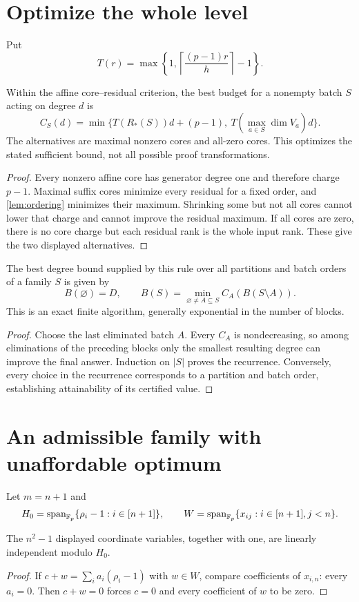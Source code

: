 \section{Optimize the whole level}
Put
\[
 T(r)=\max\left\{1,\left\lceil\frac{(p-1)r}{h}\right\rceil-1\right\}.
\]
\begin{lemma}\label{lem:batchcost}
Within the affine core--residual criterion, the best budget for a nonempty batch $S$ acting on degree $d$ is
\[
 \boxed{C_S(d)=\min\{T(R_*(S))d+(p-1),\
                       T(\max_{a\in S}\dim V_a)d\}.}
\]
The alternatives are maximal nonzero cores and all-zero cores. This optimizes the stated sufficient bound, not all possible proof transformations.
\end{lemma}
\begin{proof}
Every nonzero affine core has generator degree one and therefore charge $p-1$. Maximal suffix cores minimize every residual for a fixed order, and \cref{lem:ordering} minimizes their maximum. Shrinking some but not all cores cannot lower that charge and cannot improve the residual maximum. If all cores are zero, there is no core charge but each residual rank is the whole input rank. These give the two displayed alternatives.
\end{proof}

\begin{lemma}\label{lem:subsetdp}
The best degree bound supplied by this rule over all partitions and batch orders of a family $S$ is given by
\[
 \boxed{B(\varnothing)=D,\qquad
 B(S)=\min_{\varnothing\ne A\subseteq S}C_A(B(S\setminus A)).}
\]
This is an exact finite algorithm, generally exponential in the number of blocks.
\end{lemma}
\begin{proof}
Choose the last eliminated batch $A$. Every $C_A$ is nondecreasing, so among eliminations of the preceding blocks only the smallest resulting degree can improve the final answer. Induction on $|S|$ proves the recurrence. Conversely, every choice in the recurrence corresponds to a partition and batch order, establishing attainability of its certified value.
\end{proof}

\section{An admissible family with unaffordable optimum}
Let $m=n+1$ and
\[
 H_0=\operatorname{span}_{\mathbb F_p}\{\rho_i-1:i\in[n+1]\},\qquad
 W=\operatorname{span}_{\mathbb F_p}\{x_{ij}:i\in[n+1],j<n\}.
\]
\begin{lemma}\label{lem:coordinatequotient}
The $n^2-1$ displayed coordinate variables, together with one, are linearly independent modulo $H_0$.
\end{lemma}
\begin{proof}
If $c+w=\sum_i a_i(\rho_i-1)$ with $w\in W$, compare coefficients of $x_{i,n}$: every $a_i=0$. Then $c+w=0$ forces $c=0$ and every coefficient of $w$ to be zero.
\end{proof}

